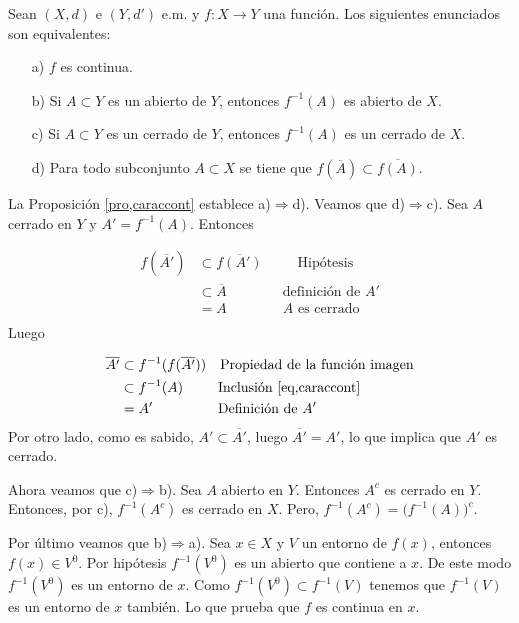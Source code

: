 \begin{teorema}\label{teo,caraccont} Sean $(X,d)$ e $(Y,d')$ e.m. y $f:X\rightarrow Y$
una funci\'on. Los siguientes enunciados son equivalentes:
\begin{itemize}
\item[a)] $f$ es continua.
\item[b)]  Si $A\subset Y$ es un abierto de $Y$, entonces $f^{-1}(A)$ es
abierto de $X$.
\item[c)] Si $A\subset Y$ es un cerrado de $Y$, entonces $f^{-1}(A)$ es
un cerrado de $X$.
\item[d)] Para todo subconjunto $A\subset X$ se tiene que
$f(\overline{A})\subset \overline{f(A)}$.
\end{itemize}
\end{teorema}
\begin{demo} La Proposici\'on \vref{pro,caraccont} establece
a)$\Rightarrow$d). Veamos que d)$\Rightarrow$c). Sea $A$ cerrado
en $Y$ y $A'=f^{-1}(A)$. Entonces

\begin{equation}\label{eq,caraccont}
  \begin{split}
       f(\overline{A'})&\subset\overline{f(A')}\quad\quad\,\,\,\text{Hip\'otesis}\\
       &\subset\overline{A}\quad\quad\quad\quad\text{definici\'on de $A'$}\\
        &=A\quad\quad\quad\quad\text{$A$ es cerrado}\\
  \end{split}
\end{equation}
Luego

\[
    \begin{split}
        \overline{A'}&\subset f^{-1}(f(\overline{A'}))\quad\text{Propiedad de la
        funci\'on imagen}\\
        &\subset f^{-1}(A)\,\,\,\quad\quad\text{Inclusi\'on
        \ref{eq,caraccont}}\\
        &=A'\quad\quad\quad\quad\,\,\,\,\text{Definici\'on de $A'$}
    \end{split}
\]
Por otro lado, como es sabido, $A'\subset \overline{A'}$, luego
$\overline{A'}=A'$, lo que implica que $A'$ es cerrado.

Ahora veamos que c)$\Rightarrow$b). Sea $A$ abierto en $Y$.
Entonces $A^c$ es cerrado en $Y$. Entonces, por c), $f^{-1}(A^c)$
es cerrado en $X$. Pero, $f^{-1}(A^c)=\bigl(f^{-1}(A)\bigr)^c$.

Por \'ultimo veamos que b)$\Rightarrow$a). Sea $x\in X$ y $V$ un
entorno de $f(x)$, entonces $f(x)\in V^0$. Por hip\'otesis
$f^{-1}(V^0)$ es un abierto que contiene a $x$. De este modo
$f^{-1}(V^0)$ es un entorno de $x$. Como $f^{-1}(V^0)\subset
f^{-1}(V)$ tenemos que $f^{-1}(V)$ es un entorno de $x$ tambi\'en.
Lo que prueba que $f$ es continua en $x$.
\end{demo}

